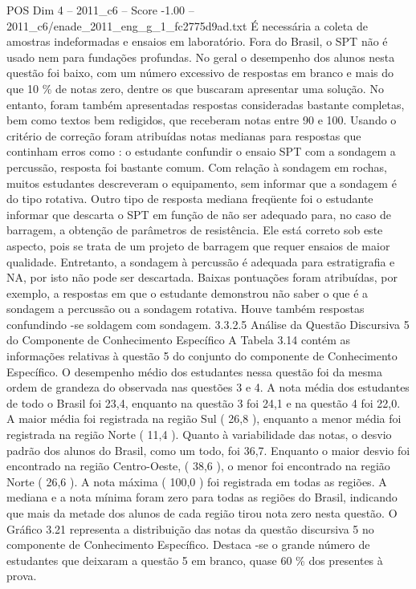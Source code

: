 \begin{textsample}{POS Dim 4 – 2011\_c6 – Score -1.00 – 2011\_c6/enade\_2011\_eng\_g\_1\_fc2775d9ad.txt}
É necessária a coleta de amostras indeformadas e ensaios em laboratório.
Fora do Brasil, o SPT não é usado nem para fundações profundas.
No geral o desempenho dos alunos nesta questão foi baixo, com um número excessivo de respostas em branco e mais do que 10 \% de notas zero, dentre os que buscaram apresentar uma solução.
No entanto, foram também apresentadas respostas consideradas bastante completas, bem como textos bem redigidos, que receberam notas entre 90 e 100.
Usando o critério de correção foram atribuídas notas medianas para respostas que continham erros como : o estudante confundir o ensaio SPT com a sondagem a percussão, resposta foi bastante comum.
Com relação à sondagem em rochas, muitos estudantes descreveram o equipamento, sem informar que a sondagem é do tipo rotativa.
Outro tipo de resposta mediana freqüente foi o estudante informar que descarta o SPT em função de não ser adequado para, no caso de barragem, a obtenção de parâmetros de resistência.
Ele está correto sob este aspecto, pois se trata de um projeto de barragem que requer ensaios de maior qualidade.
Entretanto, a sondagem à percussão é adequada para estratigrafia e NA, por isto não pode ser descartada.
Baixas pontuações foram atribuídas, por exemplo, a respostas em que o estudante demonstrou não saber o que é a sondagem a percussão ou a sondagem rotativa.
Houve também respostas confundindo -se soldagem com sondagem. 3.3.2.5 Análise da Questão Discursiva 5 do Componente de Conhecimento Específico A Tabela 3.14 contém as informações relativas à questão 5 do conjunto do componente de Conhecimento Específico.
O desempenho médio dos estudantes nessa questão foi da mesma ordem de grandeza do observada nas questões 3 e 4.
A nota média dos estudantes de todo o Brasil foi 23,4, enquanto na questão 3 foi 24,1 e na questão 4 foi 22,0.
A maior média foi registrada na região Sul ( 26,8 ), enquanto a menor média foi registrada na região Norte ( 11,4 ).
Quanto à variabilidade das notas, o desvio padrão dos alunos do Brasil, como um todo, foi 36,7.
Enquanto o maior desvio foi encontrado na região Centro-Oeste, ( 38,6 ), o menor foi encontrado na região Norte ( 26,6 ).
A nota máxima ( 100,0 ) foi registrada em todas as regiões.
A mediana e a nota mínima foram zero para todas as regiões do Brasil, indicando que mais da metade dos alunos de cada região tirou nota zero nesta questão.
O Gráfico 3.21 representa a distribuição das notas da questão discursiva 5 no componente de Conhecimento Específico.
Destaca -se o grande número de estudantes que deixaram a questão 5 em branco, quase 60 \% dos presentes à prova.

\end{textsample}
